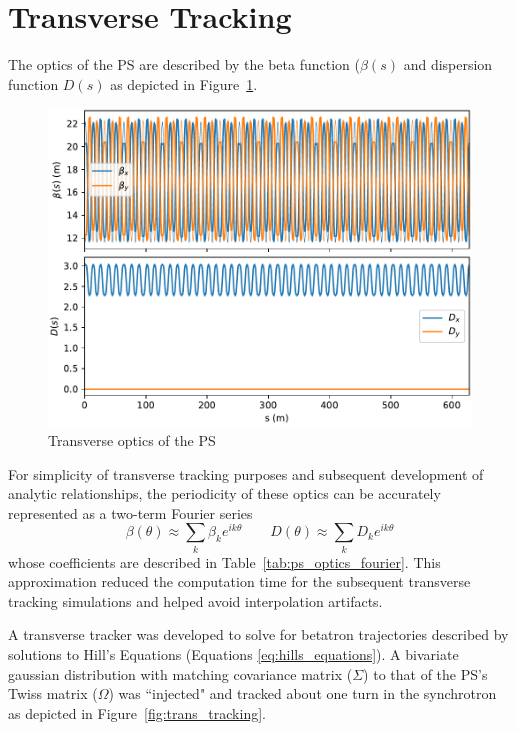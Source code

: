 \section{Transverse Tracking}

The optics of the PS are described by the beta function ($\beta(s)$ and dispersion function $D(s)$ as depicted in Figure~\ref{fig:ps_optics}.

\begin{figure}
    \centering
    \includegraphics{figs/ps_optics.pdf}
    \caption{Transverse optics of the PS}
    \label{fig:ps_optics}
\end{figure}

For simplicity of transverse tracking purposes and subsequent development of analytic relationships, the periodicity of these optics can be accurately represented as a two-term Fourier series
\begin{equation}
    \beta(\theta) \approx \sum_k \beta_k e^{i k\theta} \qquad D(\theta) \approx \sum_k D_k e^{i k\theta}
    \label{eq:optics_decomposition}
\end{equation}
whose coefficients are described in Table~\ref{tab:ps_optics_fourier}. This approximation reduced the computation time for the subsequent transverse tracking simulations and helped avoid interpolation artifacts.



A transverse tracker was developed to solve for betatron trajectories described by solutions to Hill's Equations (Equations  \ref{eq:hills_equations}). A bivariate gaussian distribution with matching covariance matrix ($\Sigma$) to that of the PS's Twiss matrix ($\Omega$) was ``injected" and tracked about one turn in the synchrotron as depicted in Figure~\ref{fig:trans_tracking}.

